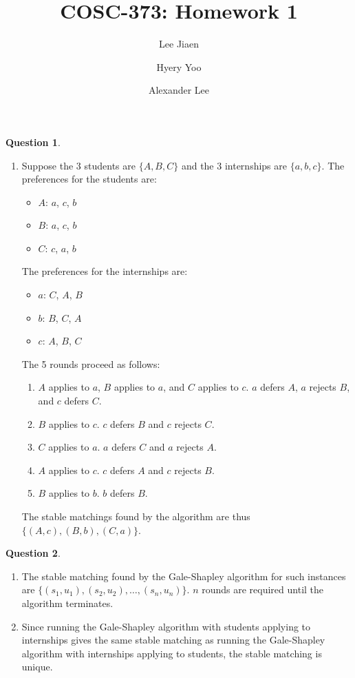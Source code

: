 \documentclass{amsart}
\title{COSC-373: Homework 1}
\author{Lee Jiaen}
\author{Hyery Yoo}
\author{Alexander Lee}
\theoremstyle{definition}
\newtheorem{question}{Question}
\begin{document}
\maketitle

\begin{question}
  \begin{enumerate}[label={(\alph*)}]
    \item Suppose the 3 students are $\{A, B, C\}$ and the 3 internships are
      $\{a, b, c\}$. The preferences for the students are:
      \begin{itemize}
        \item $A$: $a$, $c$, $b$
        \item $B$: $a$, $c$, $b$
        \item $C$: $c$, $a$, $b$
      \end{itemize}
      The preferences for the internships are:
      \begin{itemize}
        \item $a$: $C$, $A$, $B$
        \item $b$: $B$, $C$, $A$
        \item $c$: $A$, $B$, $C$
      \end{itemize}
      The 5 rounds proceed as follows:
      \begin{enumerate}[label={(\arabic*)}]
        \item $A$ applies to $a$, $B$ applies to $a$, and $C$ applies to $c$.
          $a$ defers $A$, $a$ rejects $B$, and $c$ defers $C$.
        \item $B$ applies to $c$. $c$ defers $B$ and $c$ rejects $C$.
        \item $C$ applies to $a$. $a$ defers $C$ and $a$ rejects $A$.
        \item $A$ applies to $c$. $c$ defers $A$ and $c$ rejects $B$.
        \item $B$ applies to $b$. $b$ defers $B$.
      \end{enumerate}
      The stable matchings found by the algorithm are thus $\{(A, c), (B, b),
      (C, a)\}$.
  \end{enumerate}
\end{question}

\begin{question}
  \begin{enumerate}[label={(\alph*)}]
    \item The stable matching found by the Gale-Shapley algorithm for such
      instances are $\{(s_1, u_1), (s_2, u_2), \ldots, (s_n, u_n)\}$. $n$ rounds
      are required until the algorithm terminates.
    \item Since running the Gale-Shapley algorithm with students applying to
      internships gives the same stable matching as running the Gale-Shapley
      algorithm with internships applying to students, the stable matching is
      unique.
  \end{enumerate}
\end{question}
\end{document}
